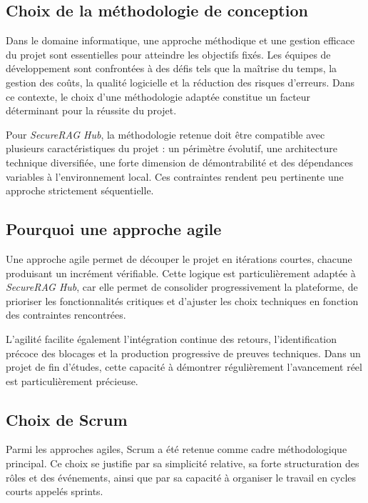 \subsection{Choix de la méthodologie de conception}

Dans le domaine informatique, une approche méthodique et une gestion efficace du projet sont essentielles pour atteindre les objectifs fixés. Les équipes de développement sont confrontées à des défis tels que la maîtrise du temps, la gestion des coûts, la qualité logicielle et la réduction des risques d’erreurs. Dans ce contexte, le choix d’une méthodologie adaptée constitue un facteur déterminant pour la réussite du projet.

Pour \textit{SecureRAG Hub}, la méthodologie retenue doit être compatible avec plusieurs caractéristiques du projet : un périmètre évolutif, une architecture technique diversifiée, une forte dimension de démontrabilité et des dépendances variables à l’environnement local. Ces contraintes rendent peu pertinente une approche strictement séquentielle.

\subsection{Pourquoi une approche agile}

Une approche agile permet de découper le projet en itérations courtes, chacune produisant un incrément vérifiable. Cette logique est particulièrement adaptée à \textit{SecureRAG Hub}, car elle permet de consolider progressivement la plateforme, de prioriser les fonctionnalités critiques et d’ajuster les choix techniques en fonction des contraintes rencontrées.

L’agilité facilite également l’intégration continue des retours, l’identification précoce des blocages et la production progressive de preuves techniques. Dans un projet de fin d’études, cette capacité à démontrer régulièrement l’avancement réel est particulièrement précieuse.

\subsection{Choix de Scrum}

Parmi les approches agiles, Scrum a été retenue comme cadre méthodologique principal. Ce choix se justifie par sa simplicité relative, sa forte structuration des rôles et des événements, ainsi que par sa capacité à organiser le travail en cycles courts appelés sprints.

